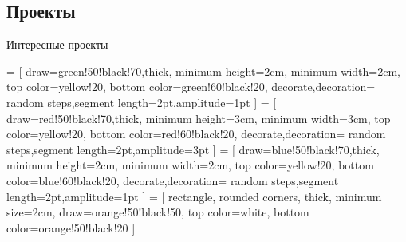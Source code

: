 \subsection{Проекты}

\begin{frame}{Интересные проекты}
    \begin{center}
         = [
            draw=green!50!black!70,thick,
            minimum height=2cm,
            minimum width=2cm,
            top color=yellow!20,
            bottom color=green!60!black!20,
            decorate,decoration={
                random steps,segment length=2pt,amplitude=1pt
            }
        ]
         = [
            draw=red!50!black!70,thick,
            minimum height=3cm,
            minimum width=3cm,
            top color=yellow!20,
            bottom color=red!60!black!20,
            decorate,decoration={
                random steps,segment length=2pt,amplitude=3pt
            }
        ]
         = [
            draw=blue!50!black!70,thick,
            minimum height=2cm,
            minimum width=2cm,
            top color=yellow!20,
            bottom color=blue!60!black!20,
            decorate,decoration={
                random steps,segment length=2pt,amplitude=1pt
            }
        ]
         = [
            rectangle, rounded corners,
            thick,
            minimum size=2cm,
            draw=orange!50!black!50,
            top color=white,
            bottom color=orange!50!black!20
        ]
\end{center}
\end{frame}
